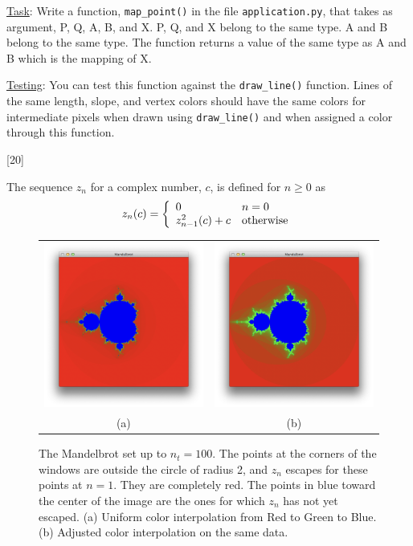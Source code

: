 \documentclass[addpoints]{exam}
\begin{document}
\begin{questions}
  \underline{Task}: Write a function, \texttt{map\_point()} in the file \texttt{application.py}, that takes as argument, P, Q, A, B, and X. P, Q, and X belong to the same type. A and B belong to the same type. The function returns a value of the same type as A and B which is the mapping of X.

  \underline{Testing}: You can test this function against the \texttt{draw\_line()} function. Lines of the same length, slope, and vertex colors should have the same colors for intermediate pixels when drawn using \texttt{draw\_line()} and when assigned a color through this function.
  
  [20]

  The sequence $z_n$ for a complex number, $c$, is defined for $n\geq 0$ as
  \[
    z_n(c) = \left\{
      \begin{array}{l@{\quad}l}
        0 & n = 0\\
        z^2_{n-1}(c)+c & \textrm{otherwise}
      \end{array}
    \right.
  \]

  \begin{figure}
    \centering
    \begin{tabular}{cc}
      \includegraphics[width=.47\linewidth]{mandelbrot1}& \includegraphics[width=.47\linewidth]{mandelbrot2}\\
      (a) & (b)
    \end{tabular}
    \label{fig:mandel}
    \caption{The Mandelbrot set up to $n_t = 100$. The points at the corners of the windows are outside the circle of radius 2, and $z_n$ escapes for these points at $n=1$. They are completely red. The points in blue toward the center of the image are the ones for which $z_n$ has not yet escaped. (a) Uniform color interpolation from Red to Green to Blue. (b) Adjusted color interpolation on the same data.}
  \end{figure}
  

\end{questions}
\end{document}
